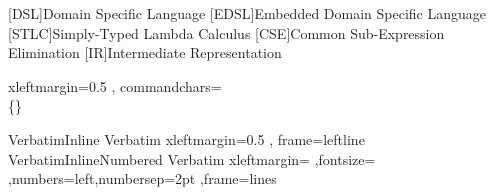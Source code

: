 [DSL]{Domain Specific Language}
[EDSL]{Embedded Domain Specific Language}
[STLC]{Simply-Typed Lambda Calculus}
[CSE]{Common Sub-Expression Elimination}
[IR]{Intermediate Representation}


\newcommand{\jfdm}[1]{\chcomment[id=jfdm]{#1}}
\newcommand{\gallais}[1]{\chcomment[id=gallais]{#1}}

\newcommand{\Velo}{V{\'e}lo\xspace}
\newcommand{\Idris}{Idris~2}
\newcommand{\DeBruijn}{De~Bruijn}

\fvset
{ xleftmargin=0.5\parindent
, commandchars=\\\{\}
}

\DefineVerbatimEnvironment%
  {VerbatimInline}
  {Verbatim}
  {xleftmargin=0.5\parindent
  , frame=leftline
  }
\DefineVerbatimEnvironment%
  {VerbatimInlineNumbered}
  {Verbatim}
  {xleftmargin=\parindent
    ,fontsize=\smaller
    ,numbers=left,numbersep=2pt
    ,frame=lines
  }

